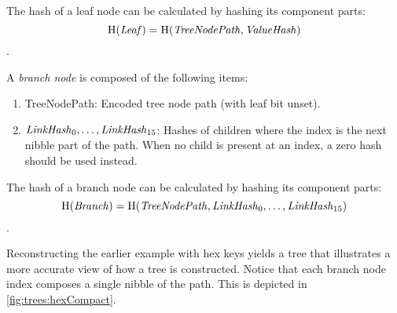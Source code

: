 The hash of a leaf node can be calculated by hashing its component parts:
$$\operatorname{H}(\mathit{Leaf}) = \operatorname{H}(\mathit{TreeNodePath}, \mathit{ValueHash})$$.

A \emph{branch node} is composed of the following items:
\begin{enumerate}
	\item{TreeNodePath: Encoded tree node path (with leaf bit unset).}
	\item{$\mathit{LinkHash}_{0}, \ldots, \mathit{LinkHash}_{15}$: Hashes of children where the index is the next nibble part of the path.
	When no child is present at an index, a zero hash should be used instead.}
\end{enumerate}

The hash of a branch node can be calculated by hashing its component parts:
$$\operatorname{H}(\mathit{Branch}) = \operatorname{H}(\mathit{TreeNodePath}, \mathit{LinkHash}_0,\ldots,\mathit{LinkHash}_{15})$$.

Reconstructing the earlier example with hex keys yields a tree that illustrates a more accurate view of how a \codenamespace tree is constructed.
Notice that each branch node index composes a single nibble of the path.
This is depicted in \autoref{fig:trees:hexCompact}.

\begin{figure}[ht]
\end{figure}

